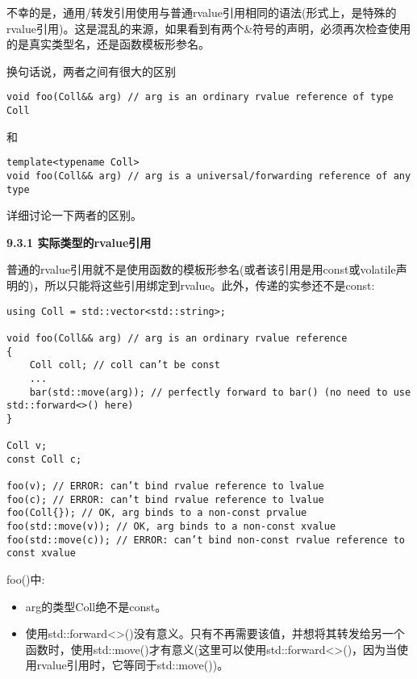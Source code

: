 不幸的是，通用/转发引用使用与普通rvalue引用相同的语法(形式上，是特殊的rvalue引用)。这是混乱的来源，如果看到有两个\&符号的声明，必须再次检查使用的是真实类型名，还是函数模板形参名。\par

换句话说，两者之间有很大的区别\par

\begin{lstlisting}[caption={}]
void foo(Coll&& arg) // arg is an ordinary rvalue reference of type Coll
\end{lstlisting}

和\par

\begin{lstlisting}[caption={}]
template<typename Coll>
void foo(Coll&& arg) // arg is a universal/forwarding reference of any type
\end{lstlisting}

详细讨论一下两者的区别。\par

\hspace*{\fill} \par %
\textbf{9.3.1 实际类型的rvalue引用}

普通的rvalue引用就不是使用函数的模板形参名(或者该引用是用const或volatile声明的)，所以只能将这些引用绑定到rvalue。此外，传递的实参还不是const:\par

\begin{lstlisting}[caption={}]
using Coll = std::vector<std::string>;

void foo(Coll&& arg) // arg is an ordinary rvalue reference
{
	Coll coll; // coll can’t be const
	...
	bar(std::move(arg)); // perfectly forward to bar() (no need to use std::forward<>() here)
}

Coll v;
const Coll c;

foo(v); // ERROR: can’t bind rvalue reference to lvalue
foo(c); // ERROR: can’t bind rvalue reference to lvalue
foo(Coll{}); // OK, arg binds to a non-const prvalue
foo(std::move(v)); // OK, arg binds to a non-const xvalue
foo(std::move(c)); // ERROR: can’t bind non-const rvalue reference to const xvalue
\end{lstlisting}

foo()中:\par

\begin{itemize}
	\item arg的类型Coll绝不是const。
	\item 使用std::forward<>()没有意义。只有不再需要该值，并想将其转发给另一个函数时，使用std::move()才有意义(这里可以使用std::forward<>()，因为当使用rvalue引用时，它等同于std::move())。
\end{itemize}


